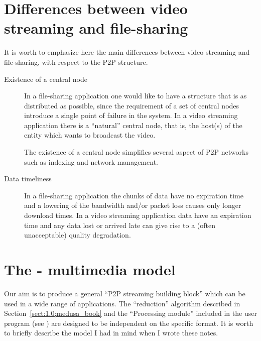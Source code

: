 \documentclass{medusabook}
\begin{document}
\section{Differences between video streaming and file-sharing}
\label{sub:1.2;medusa_book}

It is worth to emphasize here the main differences between  video
streaming and file-sharing, with respect to the P2P structure.

\begin{description}
  \item[Existence of a central node] In a file-sharing application one
  would like to have a structure that is as distributed as possible,
  since the requirement of a set of central nodes introduce a single
  point of failure in the system.  In a video streaming application
  there is a ``natural'' central node, that is, the host(s) of the
  entity which wants to broadcast the video.

  The existence of a central node simplifies several aspect of P2P
  networks such as indexing and network management.
%
  \item[Data timeliness] In a file-sharing application the chunks of
  data have no expiration time and a lowering of the bandwidth and/or
  packet loss causes only longer download times.  In a video streaming
  application data have an expiration time and any data lost or
  arrived late can give rise to a (often unacceptable) quality
  degradation.
\end{description}

\section{The \medusa- multimedia model}
\label{sect:1.6;medusa_book}

Our aim is to produce a general ``P2P streaming building block'' which
can be used in a wide range of applications. The ``reduction''
algorithm described in Section~\ref{sect:1.0;medusa_book} and the
``Processing module'' included in the user program (see
) are designed to be independent on the specific
format.  It is worth to briefly describe the model I had in mind when
I wrote these notes.
\end{document}
